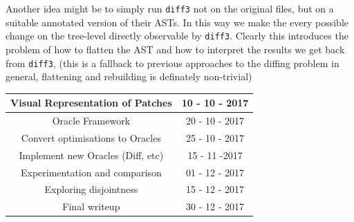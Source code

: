 \documentclass[11pt]{article}
\begin{document}
Another idea might be to simply run \texttt{diff3} not on the original files, 
but on a suitable annotated version of their ASTs. In this way we make the every 
possible change on the tree-level directly observable by \texttt{diff3}. Clearly 
this introduces the problem of how to flatten the AST and how to interpret the 
results we get back from \texttt{diff3}, (this is a fallback to previous approaches to the diffing problem in 
general, flattening and rebuilding is definately non-trivial)
\begin{center}
 \begin{tabular} { ||c|c|| }
   \hline Visual Representation of Patches & 10 - 10 - 2017 \\
   \hline
   \hline Oracle Framework & 20 - 10 - 2017 \\ 
   \hline Convert optimisations to Oracles & 25 - 10 - 2017 \\
   \hline Implement new Oracles (Diff, etc) & 15 - 11 -2017 \\ 
   \hline Experimentation and comparison & 01 - 12 - 2017 \\ 
   \hline
   \hline Exploring disjointness & 15 - 12 - 2017 \\
   \hline
   \hline Final writeup & 30 - 12 - 2017 \\
   \hline
 \end{tabular}
\end{center}
\end{document}
